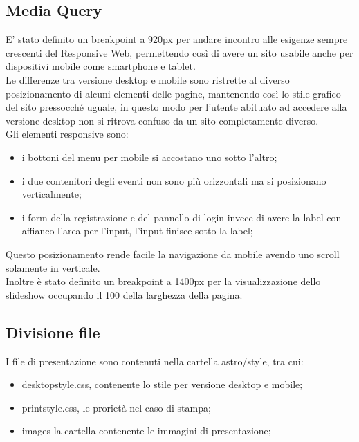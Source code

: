 	\subsection{Media Query}
	E' stato definito un breakpoint a 920px per andare incontro alle esigenze sempre crescenti del Responsive Web, permettendo così di avere un sito usabile anche per dispositivi mobile come smartphone e tablet. \\
	Le differenze tra versione desktop e mobile sono ristrette al diverso posizionamento di alcuni elementi delle pagine, mantenendo così lo stile grafico del sito pressocché uguale, in questo modo per l'utente abituato ad accedere alla versione desktop non si ritrova confuso da un sito completamente diverso. \\
	Gli elementi responsive sono:
	\begin{itemize}
		\item i bottoni del menu per mobile si accostano uno sotto l'altro;
		\item i due contenitori degli eventi non sono più orizzontali ma si posizionano verticalmente;
		\item i form della registrazione e del pannello di login invece di avere la label con affianco l'area per l'input, l'input finisce sotto la label;
	\end{itemize}  
	Questo posizionamento rende facile la navigazione da mobile avendo uno scroll solamente in verticale. \\
	Inoltre è stato definito un breakpoint a 1400px per la visualizzazione dello slideshow occupando il 100 della larghezza della pagina.
	\subsection{Divisione file}
	I file di presentazione sono contenuti nella cartella astro/style, tra cui:
	\begin{itemize}
		\item desktopstyle.css, contenente lo stile per versione desktop e mobile;
		\item printstyle.css, le prorietà nel caso di stampa;
		\item images la cartella contenente le immagini di presentazione;
	\end{itemize}
